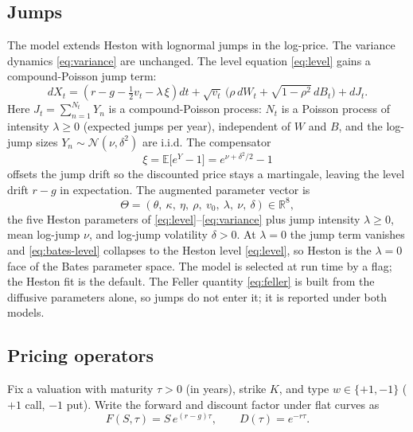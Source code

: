 \documentclass[a4paper, 11pt, reqno]{amsart}
\newcommand{\Real}{\mathbb{R}}
\begin{document}
		\subsection{Jumps}\label{sec:jumps}
			The \citet{bates1996} model extends Heston with \citet{merton1976} lognormal jumps in the
			log-price. The variance dynamics \eqref{eq:variance} are unchanged. The level equation
			\eqref{eq:level} gains a compound-Poisson jump term:
			\begin{equation}\label{eq:bates-level}
				dX_t = \left( r - g - \tfrac{1}{2} v_t - \lambda\,\xi \right) dt
				       + \sqrt{v_t}\,\bigl( \rho\, dW_t + \sqrt{1 - \rho^2}\, dB_t \bigr) + dJ_t .
			\end{equation}
			Here $J_t = \sum_{n=1}^{N_t} Y_n$ is a compound-Poisson process: $N_t$ is a Poisson process
			of intensity $\lambda\ge 0$ (expected jumps per year), independent of $W$ and $B$, and the
			log-jump sizes $Y_n \sim \mathcal{N}(\nu,\delta^2)$ are i.i.d. The compensator
			\begin{equation}\label{eq:bates-compensator}
				\xi = \mathbb{E}\bigl[ e^{Y} - 1 \bigr] = e^{\nu + \delta^2/2} - 1
			\end{equation}
			offsets the jump drift so the discounted price stays a martingale, leaving the level drift
			$r-g$ in expectation. The augmented parameter vector is
			\begin{equation}\label{eq:bates-params}
				\Theta = (\theta,\ \kappa,\ \eta,\ \rho,\ v_0,\ \lambda,\ \nu,\ \delta) \in \Real^8,
			\end{equation}
			the five Heston parameters of \eqref{eq:level}--\eqref{eq:variance} plus jump intensity
			$\lambda\ge 0$, mean log-jump $\nu$, and log-jump volatility $\delta>0$. At $\lambda=0$ the
			jump term vanishes and \eqref{eq:bates-level} collapses to the Heston level \eqref{eq:level},
			so Heston is the $\lambda=0$ face of the Bates parameter space. The model is selected at run
			time by a flag; the Heston fit is the default. The Feller quantity \eqref{eq:feller} is built
			from the diffusive parameters alone, so jumps do not enter it; it is reported under both models.

		\subsection{Pricing operators}\label{sec:pricing}
			Fix a valuation with maturity $\tau>0$ (in years), strike $K$, and type
			$w\in\{+1,-1\}$ ($+1$ call, $-1$ put). Write the forward and discount factor under flat
			curves as
			\begin{equation}\label{eq:forward}
				F(S,\tau) = S\, e^{(r-g)\tau}, \qquad D(\tau) = e^{-r\tau}.
			\end{equation}
		
\end{document}
